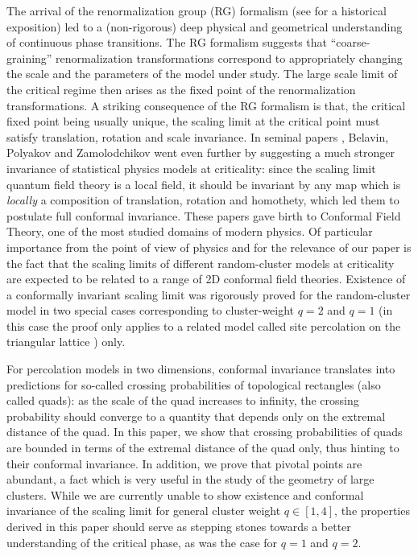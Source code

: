 \documentclass[a4paper,oneside,11pt]{article}
\numberwithin{equation}{section}
\numberwithin{equation}{section}
\numberwithin{equation}{section}
\begin{document}
The arrival of the renormalization group (RG) formalism (see \cite{Fis98} for a historical
exposition) led to a (non-rigorous) deep physical and geometrical understanding of continuous phase transitions. The RG formalism suggests that ``coarse-graining'' renormalization transformations correspond to appropriately changing the scale and the parameters of the model under study. The large scale limit of the critical regime then arises as the fixed
point of the renormalization transformations. 
A striking consequence of the RG formalism is that, the critical fixed point being usually unique, the scaling limit at the critical point must satisfy translation, rotation
and scale invariance. In seminal papers \cite{BPZ84b,BPZ84a}, Belavin, Polyakov and
Zamolodchikov went even further by suggesting a much stronger invariance of statistical physics models at criticality: since the scaling limit
quantum field theory is a local field, it should be invariant by any map which is
{\em locally} a composition of translation, rotation and homothety, which led them to postulate full conformal invariance. These papers gave birth to Conformal Field Theory, one of the most studied domains of modern physics. Of particular importance from the point of view of physics and for the relevance of our paper is the fact that the scaling limits of different random-cluster models at criticality are expected to be related to a range of 2D conformal field theories. Existence of a conformally invariant scaling limit was rigorously proved for the random-cluster model in two special cases corresponding to cluster-weight $q=2$ \cite{Smi10,CheDumHon12a,KemSmi16} and $q=1$ (in this case the proof only applies to a related model called site percolation on the triangular lattice \cite{Smi01}) only.


For percolation models in two dimensions, conformal invariance translates into predictions for so-called crossing probabilities of topological rectangles (also called quads): as the scale of the quad increases to infinity, the crossing probability should converge to a quantity that depends only on the extremal distance of the quad.   
In this paper, we show that crossing probabilities of quads are bounded in terms of the extremal distance of the quad only, thus hinting to their conformal invariance. In addition, we prove that pivotal points are abundant, a fact which is very useful in the study of the geometry of large clusters. While we are currently unable to show existence and conformal invariance of the scaling limit for general cluster weight $q \in [1,4]$, the properties derived in this paper should serve as stepping stones towards a better understanding of the critical phase, as was the case for $q = 1$ and $q = 2$. 
\end{document}
